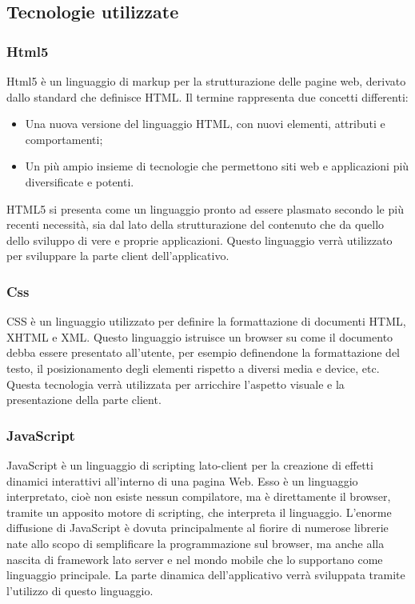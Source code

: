 \subsection{Tecnologie utilizzate}
\subsubsection{Html5}
Html5 è un linguaggio di markup per la strutturazione delle pagine web, derivato dallo standard che definisce HTML.
Il termine rappresenta due concetti differenti:
\begin{itemize}
		\item
			Una nuova versione del linguaggio HTML, con nuovi elementi, attributi e comportamenti;
		\item
			Un più ampio insieme di tecnologie che permettono siti web e applicazioni più diversificate e potenti.
\end{itemize}
HTML5 si presenta come un linguaggio pronto ad essere plasmato secondo le più recenti necessità, sia dal lato della strutturazione del contenuto che da quello dello sviluppo di vere e proprie applicazioni.
Questo linguaggio verrà utilizzato per sviluppare la parte client dell'applicativo.

\subsubsection{Css}
CSS è un linguaggio utilizzato per definire la formattazione di documenti HTML, XHTML e XML.
Questo linguaggio istruisce un browser su come il documento debba essere presentato all'utente, per esempio definendone la formattazione del testo, il posizionamento degli elementi rispetto a diversi media e device, etc.
Questa tecnologia verrà utilizzata per arricchire l'aspetto visuale e la presentazione della parte client.

\subsubsection{JavaScript}
JavaScript è un linguaggio di scripting lato-client per la creazione di effetti dinamici interattivi all'interno di una pagina Web. Esso è un linguaggio interpretato, cioè non esiste nessun compilatore, ma è direttamente il browser, tramite un apposito motore di scripting, che interpreta il linguaggio.
L'enorme diffusione di JavaScript è dovuta principalmente al fiorire di numerose librerie nate allo scopo di semplificare la programmazione sul browser, ma anche alla nascita di framework lato server e nel mondo mobile che lo supportano come linguaggio principale.
La parte dinamica dell'applicativo verrà sviluppata tramite l'utilizzo di questo linguaggio.

